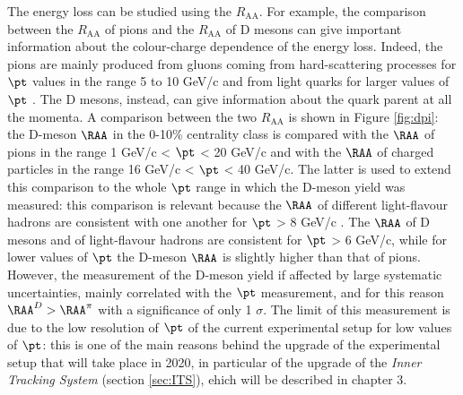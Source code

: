 The energy loss can be studied using the $R_{\mathrm{AA}}$. For example, the comparison between the $R_{\mathrm{AA}}$ of pions and the $R_{\mathrm{AA}}$ of D mesons can give important information about the colour-charge dependence of the energy loss. Indeed, the pions are mainly produced from gluons coming from hard-scattering processes for $\pt$ values in the range 5 to 10 GeV/c and from light quarks for larger values of $\pt$ \cite{puzzle}. The D mesons, instead, can give information about the quark parent at all the momenta. A comparison between the two $R_{\mathrm{AA}}$ is shown in Figure \ref{fig:dpi}: the D-meson $\RAA$ in the 0-10\% centrality class is compared with the $\RAA$ of pions in the range 1 GeV/c < $\pt$ < 20 GeV/c and with the $\RAA$ of charged particles in the range 16 GeV/c < $\pt$ < 40 GeV/c. The latter is used to extend this comparison to the whole $\pt$ range in which the D-meson yield was measured: this comparison is relevant because the $\RAA$ of different light-flavour hadrons are consistent with one another for $\pt$ > 8 GeV/c \cite{different}. The $\RAA$ of D mesons and of light-flavour hadrons are consistent for $\pt$ > 6 GeV/c, while for lower values of $\pt$ the D-meson $\RAA$ is slightly higher than that of pions. However, the measurement of the D-meson yield if affected by large systematic uncertainties, mainly correlated with the $\pt$ measurement, and for this reason $\RAA^{D} > \RAA^{\pi}$ with a significance of only 1 $\sigma$. The limit of this measurement is due to the low resolution of $\pt$ of the current experimental setup for low values of $\pt$: this is one of the main reasons behind the upgrade of the experimental setup that will take place in 2020, in particular of the upgrade of the \textit{Inner Tracking System} (section \ref{sec:ITS}), ehich will be described in chapter 3.
%
